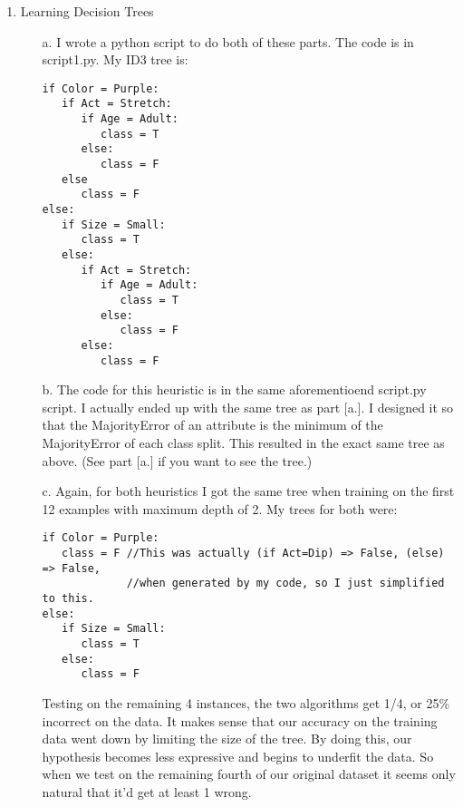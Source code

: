 

\oddsidemargin 0in
\evensidemargin 0in
\textwidth 6.5in
\topmargin -0.5in
\textheight 9.0in




\pagestyle{myheadings}

\begin{enumerate}
\item Learning Decision Trees
      \begin{enumerate}
        \item[a.]
                I wrote a python script to do both of these parts. The code is in script1.py.
                My ID3 tree is:
                \begin{verbatim}
if Color = Purple:
   if Act = Stretch:
      if Age = Adult:
         class = T
      else:
         class = F
   else
      class = F
else:
   if Size = Small:
      class = T
   else:
      if Act = Stretch:
         if Age = Adult:
            class = T
         else:
            class = F
      else:
         class = F
               \end{verbatim}
       \item[b.]
                The code for this heuristic is in the same aforementioend script.py script. I actually ended up with the same tree as part [a.]. I designed it so that the MajorityError of an attribute is the minimum of the MajorityError of each class split. This resulted in the exact same tree as above. (See part [a.] if you want to see the tree.)
       \item[c.]
                Again, for both heuristics I got the same tree when training on the first 12 examples with maximum depth of 2. My trees for both were:
\               \begin{verbatim}
if Color = Purple:
   class = F //This was actually (if Act=Dip) => False, (else) => False, 
             //when generated by my code, so I just simplified to this.
else:
   if Size = Small:
      class = T
   else:
      class = F
                \end{verbatim}
                Testing on the remaining 4 instances, the two algorithms get 1/4, or 25\% incorrect on the data. It makes sense that our accuracy on the training data went down by limiting the size of the tree. By doing this, our hypothesis becomes less expressive and begins to underfit the data. So when we test on the remaining fourth of our original dataset it seems only natural that it'd get at least 1 wrong.
     \end{enumerate}
                      

\end{enumerate}
